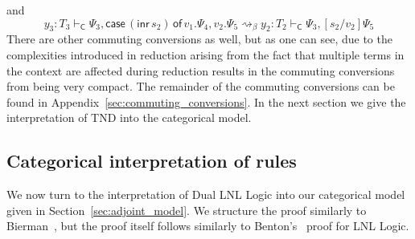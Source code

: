 \documentclass{lmcs}
\newcommand{\DualLNLLogicnt}[1]{\mathit{#1}}
\newcommand{\DualLNLLogicmv}[1]{\mathit{#1}}
\newcommand{\DualLNLLogicsym}[1]{#1}
\begin{document}
and
\[
 \DualLNLLogicmv{y_{{\mathrm{3}}}}  :  \DualLNLLogicnt{T_{{\mathrm{3}}}}  \vdash_{\mathsf{C} }  \Psi_{{\mathrm{3}}}  \DualLNLLogicsym{,}   \mathsf{case}\, \DualLNLLogicsym{(}   \mathsf{inr}\, \DualLNLLogicnt{s_{{\mathrm{2}}}}   \DualLNLLogicsym{)} \,\mathsf{of}\, \DualLNLLogicmv{v_{{\mathrm{1}}}} . \Psi_{{\mathrm{4}}} ,  \DualLNLLogicmv{v_{{\mathrm{2}}}} . \Psi_{{\mathrm{5}}}   \rightsquigarrow_{\beta}
 \DualLNLLogicmv{y_{{\mathrm{2}}}}  :  \DualLNLLogicnt{T_{{\mathrm{2}}}}  \vdash_{\mathsf{C} }  \Psi_{{\mathrm{3}}}  \DualLNLLogicsym{,}  \DualLNLLogicsym{[}  \DualLNLLogicnt{s_{{\mathrm{2}}}}  \DualLNLLogicsym{/}  \DualLNLLogicmv{v_{{\mathrm{2}}}}  \DualLNLLogicsym{]}  \Psi_{{\mathrm{5}}} 
\]
There are other commuting conversions as well, but as one can see, due
to the complexities introduced in reduction arising from the fact that
multiple terms in the context are affected during reduction results in
the commuting conversions from being very compact.  The remainder of
the commuting conversions can be found in
Appendix~\ref{sec:commuting_conversions}.  In the next section we give
the interpretation of TND into the categorical model.

\subsection{Categorical interpretation of rules}
\label{sec:categorical_interpretation_of_rules}

We now turn to the interpretation of Dual LNL Logic into our
categorical model given in Section~\ref{sec:adjoint_model}.  We
structure the proof similarly to Bierman~\cite{Bierman:1994}, but the
proof itself follows similarly to Benton's~\cite{Benton:1994} proof
for LNL Logic.
\end{document}
